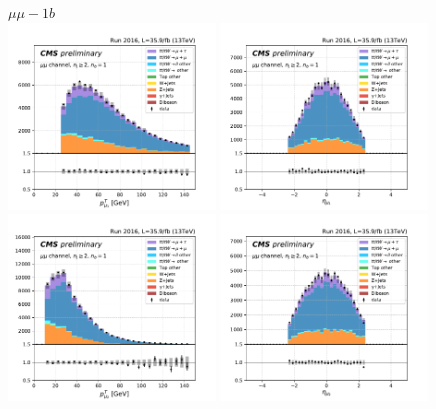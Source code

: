 \begin{figure}[ht]
    \centering
    $\mu\mu - 1b$ \\
    \includegraphics[width=0.49\textwidth]{chapters/Analysis/sectionPlots/figures/kinematics_pickles/mumu/1b/mumu_1b_lepton1_pt.pdf}
    \includegraphics[width=0.49\textwidth]{chapters/Analysis/sectionPlots/figures/kinematics_pickles/mumu/1b/mumu_1b_lepton1_eta.pdf}
    \includegraphics[width=0.49\textwidth]{chapters/Analysis/sectionPlots/figures/kinematics_pickles/mumu/1b/mumu_1b_lepton2_pt.pdf}
    \includegraphics[width=0.49\textwidth]{chapters/Analysis/sectionPlots/figures/kinematics_pickles/mumu/1b/mumu_1b_lepton2_eta.pdf}

\end{figure}
